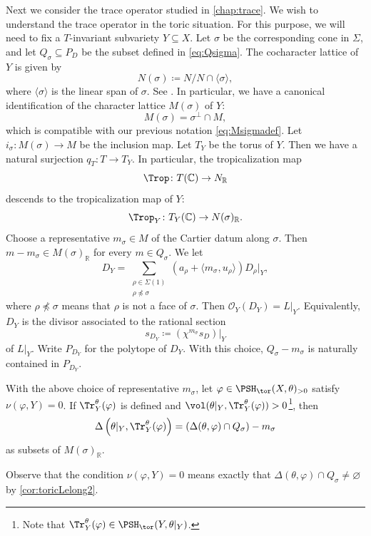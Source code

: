 Next we consider the trace operator studied in \cref{chap:trace}. We wish to understand the trace operator in the toric situation.
For this purpose, we will need to fix a $T$-invariant subvariety $Y\subseteq X$. Let $\sigma$ be the corresponding cone in $\Sigma$, and let $Q_{\sigma}\subseteq P_D$ be the subset defined in \eqref{eq:Qsigma}.
The cocharacter lattice of $Y$ is given by
\[
N(\sigma)\coloneqq N/N\cap \langle \sigma \rangle,
\]
where $\langle \sigma \rangle$ is the linear span of $\sigma$. See \cite[(3.2.6)]{CLS11}. In particular, we have a canonical identification of the character lattice $M(\sigma)$ of $Y$:
\[
M(\sigma)=\sigma^{\perp}\cap M,
\]
which is compatible with our previous notation \eqref{eq:Msigmadef}.
Let $i_{\sigma}\colon M(\sigma)\rightarrow M$ be the inclusion map.
Let $T_Y$ be the torus of $Y$. Then we have a natural surjection $q_T\colon T\rightarrow T_Y$. In particular, the tropicalization map
\[
\Trop\colon T(\mathbb{C})\rightarrow N_{\mathbb{R}}
\]
descends to the tropicalization map of $Y$:
\[
\Trop_Y\colon T_Y(\mathbb{C})\rightarrow N(\sigma)_{\mathbb{R}}.
\]
Choose a representative $m_{\sigma}\in M$ of the Cartier datum along $\sigma$. Then $m-m_{\sigma}\in M(\sigma)_{\mathbb{R}}$ for every $m\in Q_{\sigma}$.
We let
\[
D_Y=\sum_{\substack{\rho\in \Sigma(1)\\ \rho\not\preceq\sigma}} \left(a_{\rho}+\langle m_{\sigma},u_{\rho}\rangle\right)D_{\rho}|_Y,
\]
where $\rho\not\preceq\sigma$ means that $\rho$ is not a face of $\sigma$. Then $\mathcal{O}_Y(D_Y)=L|_Y$.
Equivalently, $D_Y$ is the divisor associated to the rational section
\[
s_{D_Y}\coloneqq (\chi^{m_{\sigma}}s_D)|_Y
\]
of $L|_Y$. Write $P_{D_Y}$ for the polytope of $D_Y$. With this choice, $Q_{\sigma}-m_{\sigma}$ is naturally contained in $P_{D_Y}$.


\begin{theorem}\label{thm:tracetor}
With the above choice of representative $m_{\sigma}$, let $\varphi\in \PSH_{\tor}(X,\theta)_{>0}$ satisfy $\nu(\varphi,Y)=0$. If $\Tr_Y^{\theta}(\varphi)$ is defined and $\vol (\theta|_Y,\Tr_Y^{\theta}(\varphi))>0$\footnote{Note that $\Tr_Y^{\theta}(\varphi)\in \PSH_{\tor}(Y,\theta|_Y)$.}, then
\[
\Delta\left(\theta|_Y,\Tr_Y^{\theta}(\varphi)\right)= \left(\Delta(\theta,\varphi)\cap Q_{\sigma}\right)-m_{\sigma}
\]
as subsets of $M(\sigma)_{\mathbb{R}}$.
\end{theorem}
Observe that the condition $\nu(\varphi,Y)=0$ means exactly that $\Delta(\theta,\varphi)\cap Q_{\sigma}\neq \varnothing$ by \cref{cor:toricLelong2}.


